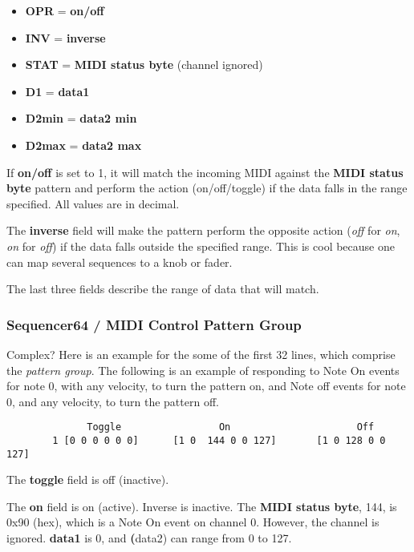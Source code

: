    \begin{itemize}
      \item \textbf{OPR} = \textbf{on/off}
      \item \textbf{INV} = \textbf{inverse}
      \item \textbf{STAT} = \textbf{MIDI status byte} (channel ignored) 
      \item \textbf{D1} = \textbf{data1}
      \item \textbf{D2min} = \textbf{data2 min}
      \item \textbf{D2max} = \textbf{data2 max}
   \end{itemize}

   If \textbf{on/off} is set to 1, it will match the incoming MIDI against
   the \textbf{MIDI status byte} pattern and perform the action
   (on/off/toggle) if the data falls in the range specified.  All values are
   in decimal.

	The \textbf{inverse} field will make the pattern perform the opposite 
   action (\textsl{off} for \textsl{on}, \textsl{on} for \textsl{off}) if
   the data falls outside the specified range.  This is cool because one can
   map several sequences to a knob or fader.

	The last three fields describe the range of data that will match.

\subsubsection{Sequencer64 / MIDI Control Pattern Group}
\label{subsubsec:seq64_rc_file_midi_control_pattern_group}

   Complex?  Here is an example for the some of the first 32 lines, which
   comprise the \textsl{pattern group}.
   The following is an example of responding
   to Note On events for note 0, with any velocity, to turn the pattern on,
   and Note off events for note 0, and any velocity, to turn the pattern
   off.

   \begin{verbatim}
	          Toggle                 On                      Off
        1 [0 0 0 0 0 0]      [1 0  144 0 0 127]       [1 0 128 0 0 127]
   \end{verbatim}

   The \textbf{toggle} field is off (inactive).

   The \textbf{on} field is on (active).  Inverse is inactive.  The
   \textbf{MIDI status byte}, 144, is 0x90 (hex), which is a Note On event
   on channel 0.  However, the channel is ignored.  \textbf{data1} is 0, and
   \textbf(data2) can range from 0 to 127.

